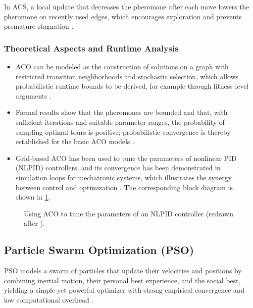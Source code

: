 In ACS, a local update that decreases the pheromone after each move lowers the
pheromone on recently used edges, which encourages exploration and prevents
premature stagnation \cite{panigrahi2011handbook}.

\subsubsection{Theoretical Aspects and Runtime Analysis}

\begin{itemize}
  \item {} ACO can be modeled as the construction of
        solutions on a graph with restricted transition neighborhoods and
        stochastic selection, which allows probabilistic runtime bounds to be
        derived, for example through fitness-level arguments
        \cite{gutjahr2007mathematical}.
  \item {} Formal results show that the pheromones are bounded
        and that, with sufficient iterations and suitable parameter ranges, the
        probability of sampling optimal tours is positive; probabilistic
        convergence is thereby established for the basic ACO models
        \cite{gutjahr2007mathematical}.
  \item {} Grid-based ACO has been used to tune the
        parameters of nonlinear PID (NLPID) controllers, and its convergence has
        been demonstrated in simulation loops for mechatronic systems, which
        illustrates the synergy between control and optimization
        \cite{panigrahi2011handbook}. The corresponding block diagram is shown in
        \cref{fig:aco-nlpid}.
\end{itemize}

\begin{figure}[htbp]
  \centering
  \caption{Using ACO to tune the parameters of an NLPID controller (redrawn after
           \cite{panigrahi2011handbook}).}
  \label{fig:aco-nlpid}
\end{figure}

\subsection{Particle Swarm Optimization (PSO)}

PSO models a swarm of particles that update their velocities and positions by
combining inertial motion, their personal best experience, and the social best,
yielding a simple yet powerful optimizer with strong empirical convergence and
low computational overhead \cite{nguyen2024swarm}.

